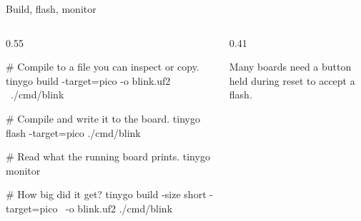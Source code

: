\documentclass[10pt,aspectratio=169,t]{beamer}
\begin{document}
\begin{frame}[embedded,fragile,eyebrow=TinyGo]{Build, flash, monitor}
  \begin{columns}[T]
    \begin{column}{0.55\textwidth}
\begin{shell}
# Compile to a file you can inspect or copy.
tinygo build -target=pico -o blink.uf2 \
    ./cmd/blink

# Compile and write it to the board.
tinygo flash -target=pico ./cmd/blink

# Read what the running board prints.
tinygo monitor

# How big did it get?
tinygo build -size short -target=pico \
    -o blink.uf2 ./cmd/blink
\end{shell}
    \end{column}
    \begin{column}{0.41\textwidth}
      \begin{warning}[Bootloader mode]
        Many boards need a button held during reset to accept a flash.
      \end{warning}
    \end{column}
  \end{columns}
\end{frame}
\end{document}
